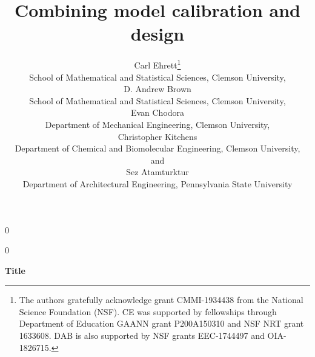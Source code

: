 \documentclass[12pt]{article}
\date{}
\newcommand{\blind}{0}
\begin{document}
%

\def\spacingset#1{\renewcommand{\baselinestretch}%
{#1}\small\normalsize} \spacingset{1}



\blind
{
  \title{\bf Combining model calibration and design}
  \author{Carl Ehrett\thanks{
  		The authors gratefully acknowledge grant CMMI-1934438 from the National Science Foundation (NSF). CE was supported by fellowships through Department of Education GAANN grant P200A150310 and NSF NRT grant 1633608. DAB is also supported by NSF grants EEC-1744497 and OIA-1826715.}\hspace{.2cm}\\
    School of Mathematical and Statistical Sciences, Clemson University,\\
    D. Andrew Brown \\
    School of Mathematical and Statistical Sciences, Clemson University,\\
    Evan Chodora \\
    Department of Mechanical Engineering, Clemson University,\\
    Christopher Kitchens \\
    Department of Chemical and Biomolecular Engineering, Clemson University,\\
    and \\
    Sez Atamturktur \\
    Department of Architectural Engineering, Pennsylvania State University\\}
  \maketitle
} \fi

\blind
{
  \bigskip
  \bigskip
  \bigskip
  \begin{center}
    {\LARGE\bf Title}
\end{center}
  \medskip
} \fi
\end{document}
